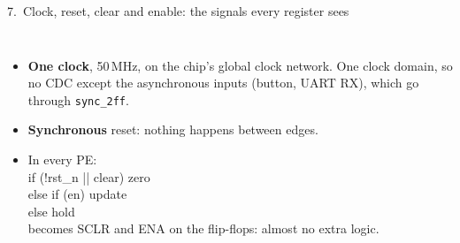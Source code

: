 \documentclass[aspectratio=169,11pt]{beamer}
\newcommand{\sig}[1]{\texttt{#1}}
\begin{document}
\begin{frame}{7.\ Clock, reset, clear and enable: the signals every register sees}
\begin{columns}[T]
{}
    \small
    \begin{itemize}
      \item \textbf{One clock}, 50\,MHz, on the chip's global clock network. One clock domain, so no CDC except
            the asynchronous inputs (button, UART RX), which go through \sig{sync\_2ff}.
      \item \textbf{Synchronous} reset: nothing happens between edges.
      \item In every PE:\\[1mm]
      {\ttfamily\scriptsize if (!rst\_n || clear) zero\\
       else if (en) update\\
       else hold}\\[1mm]
      becomes SCLR and ENA on the flip-flops: almost no extra logic.
    \end{itemize}
  \end{columns}
\end{frame}

\end{document}
